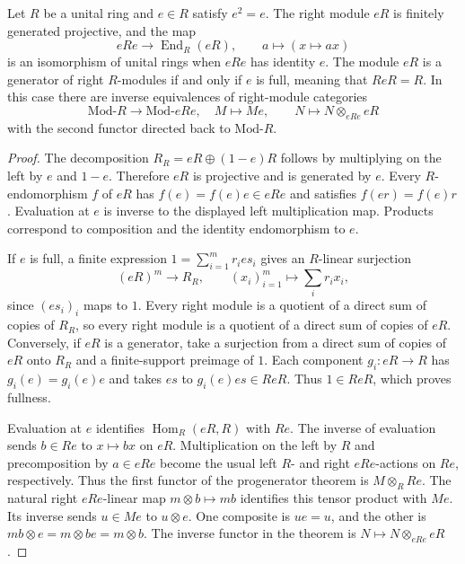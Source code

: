 \begin{corollary}
\label{cor:rm03-full-corner}
Let \(R\) be a unital ring and \(e\in R\) satisfy \(e^2=e\). The
right module \(eR\) is finitely generated projective, and the map
\[
   eRe\longrightarrow\operatorname{End}_R(eR),\qquad
   a\longmapsto (x\longmapsto ax)
\]
is an isomorphism of unital rings when \(eRe\) has identity \(e\).
The module \(eR\) is a generator of right \(R\)-modules if and only if
\(e\) is full, meaning that \(ReR=R\). In this case there are inverse
equivalences of right-module categories
\[
   \mathrm{Mod}\text{-}R \longrightarrow \mathrm{Mod}\text{-}eRe,
   \quad M\longmapsto Me,
   \qquad
   N\longmapsto N\otimes_{eRe}eR
\]
with the second functor directed back to \(\mathrm{Mod}\text{-}R\).
\end{corollary}
\begin{proof}
The decomposition \(R_R=eR\oplus(1-e)R\) follows by multiplying on
the left by \(e\) and \(1-e\). Therefore \(eR\) is projective and is
generated by \(e\). Every \(R\)-endomorphism \(f\) of \(eR\) has
\(f(e)=f(e)e\in eRe\) and satisfies \(f(er)=f(e)r\). Evaluation at
\(e\) is inverse to the displayed left multiplication map. Products
correspond to composition and the identity endomorphism to \(e\).

If \(e\) is full, a finite expression
\(1=\sum_{i=1}^m r_i e s_i\) gives an \(R\)-linear surjection
\[
    (eR)^m\longrightarrow R_R,\qquad
    (x_i)_{i=1}^m\longmapsto\sum_i r_i x_i,
\]
since \((e s_i)_i\) maps to \(1\). Every right module is a quotient
of a direct sum of copies of \(R_R\), so every right module is a
quotient of a direct sum of copies of \(eR\). Conversely, if \(eR\)
is a generator, take a surjection from a direct sum of copies of
\(eR\) onto \(R_R\) and a finite-support preimage of \(1\). Each
component \(g_i:eR\to R\) has \(g_i(e)=g_i(e)e\) and takes \(e s\)
to \(g_i(e)e s\in ReR\). Thus \(1\in ReR\), which proves fullness.

Evaluation at \(e\) identifies \(\operatorname{Hom}_R(eR,R)\)
with \(Re\). The inverse of evaluation sends \(b\in Re\) to
\(x\mapsto bx\) on \(eR\). Multiplication on the left by \(R\)
and precomposition by \(a\in eRe\) become the usual left \(R\)- and
right \(eRe\)-actions on \(Re\), respectively. Thus the first
functor of the progenerator theorem is \(M\otimes_R Re\).
The natural right \(eRe\)-linear map \(m\otimes b\mapsto mb\)
identifies this tensor product with \(Me\). Its inverse sends
\(u\in Me\) to \(u\otimes e\). One composite is \(ue=u\), and
the other is \(mb\otimes e=m\otimes be=m\otimes b\).
The inverse functor in the theorem is \(N\mapsto N\otimes_{eRe}eR\).
\end{proof}

